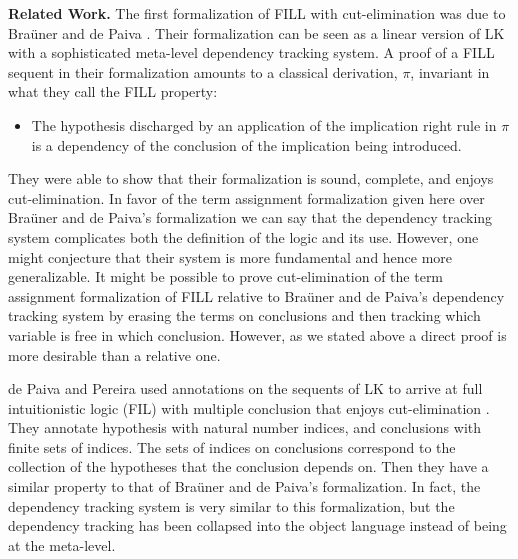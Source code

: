 \documentclass{elsarticle}
\begin{document}
\textbf{Related Work.} The first formalization of FILL with
cut-elimination was due to Bra\"uner and de Paiva \cite{Brauner:1998}.
Their formalization can be seen as a linear version of LK with a
sophisticated meta-level dependency tracking system.  A proof of a
FILL sequent in their formalization amounts to a classical derivation,
$\pi$, invariant in what they call the FILL property:
\begin{center}
  \begin{itemize}
  \item The hypothesis discharged by an application of the implication
    right rule in $\pi$ is a dependency of the conclusion of the
    implication being introduced.
  \end{itemize}
\end{center}
They were able to show that their formalization is sound, complete,
and enjoys cut-elimination.  In favor of the term assignment
formalization given here over Bra\"uner and de Paiva's formalization
we can say that the dependency tracking system complicates both the
definition of the logic and its use.  However, one might conjecture
that their system is more fundamental and hence more generalizable.
It might be possible to prove cut-elimination of the term assignment
formalization of FILL relative to Bra\"uner and de Paiva's dependency
tracking system by erasing the terms on conclusions and then tracking
which variable is free in which conclusion.  However, as we stated
above a direct proof is more desirable than a relative one.

de Paiva and Pereira used annotations on the sequents of LK to arrive
at full intuitionistic logic (FIL) with multiple conclusion that
enjoys cut-elimination \cite{dePaiva:2005}. They annotate hypothesis
with natural number indices, and conclusions with finite sets of
indices.  The sets of indices on conclusions correspond to the
collection of the hypotheses that the conclusion depends on.  Then
they have a similar property to that of Bra\"uner and de Paiva's
formalization.  In fact, the dependency tracking system is very
similar to this formalization, but the dependency tracking has been
collapsed into the object language instead of being at the meta-level.
\end{document}
